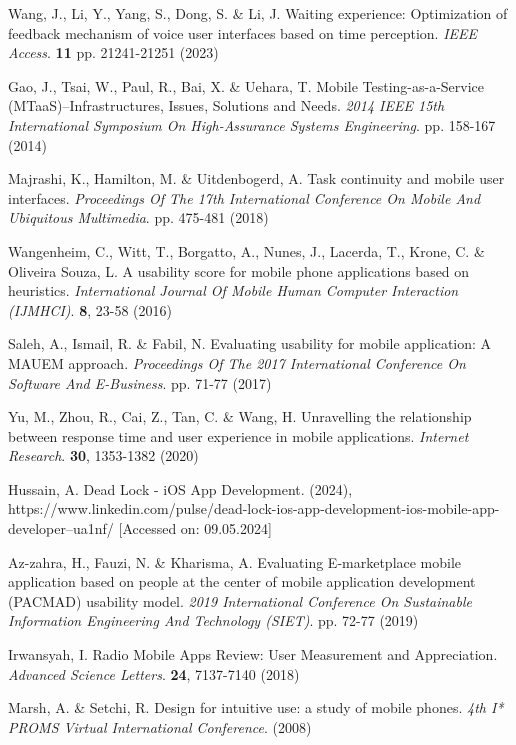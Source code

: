 \documentclass[preprint,12pt]{elsarticle}
\begin{document}
\begin{thebibliography}{99}
Wang, J., Li, Y., Yang, S., Dong, S. \& Li, J. Waiting experience: Optimization of feedback mechanism of voice user interfaces based on time perception. {\em IEEE Access}. \textbf{11} pp. 21241-21251 (2023)

Gao, J., Tsai, W., Paul, R., Bai, X. \& Uehara, T. Mobile Testing-as-a-Service (MTaaS)–Infrastructures, Issues, Solutions and Needs. {\em 2014 IEEE 15th International Symposium On High-Assurance Systems Engineering}. pp. 158-167 (2014)

Majrashi, K., Hamilton, M. \& Uitdenbogerd, A. Task continuity and mobile user interfaces. {\em Proceedings Of The 17th International Conference On Mobile And Ubiquitous Multimedia}. pp. 475-481 (2018)

Wangenheim, C., Witt, T., Borgatto, A., Nunes, J., Lacerda, T., Krone, C. \& Oliveira Souza, L. A usability score for mobile phone applications based on heuristics. {\em International Journal Of Mobile Human Computer Interaction (IJMHCI)}. \textbf{8}, 23-58 (2016)

Saleh, A., Ismail, R. \& Fabil, N. Evaluating usability for mobile application: A MAUEM approach. {\em Proceedings Of The 2017 International Conference On Software And E-Business}. pp. 71-77 (2017)

Yu, M., Zhou, R., Cai, Z., Tan, C. \& Wang, H. Unravelling the relationship between response time and user experience in mobile applications. {\em Internet Research}. \textbf{30}, 1353-1382 (2020)

Hussain, A. Dead Lock - iOS App Development.  (2024), https://www.linkedin.com/pulse/dead-lock-ios-app-development-ios-mobile-app-developer–ua1nf/ [Accessed on: 09.05.2024]

Az-zahra, H., Fauzi, N. \& Kharisma, A. Evaluating E-marketplace mobile application based on people at the center of mobile application development (PACMAD) usability model. {\em 2019 International Conference On Sustainable Information Engineering And Technology (SIET)}. pp. 72-77 (2019)

Irwansyah, I. Radio Mobile Apps Review: User Measurement and Appreciation. {\em Advanced Science Letters}. \textbf{24}, 7137-7140 (2018)

Marsh, A. \& Setchi, R. Design for intuitive use: a study of mobile phones. {\em 4th I* PROMS Virtual International Conference}. (2008)


\end{thebibliography}
\end{document}
